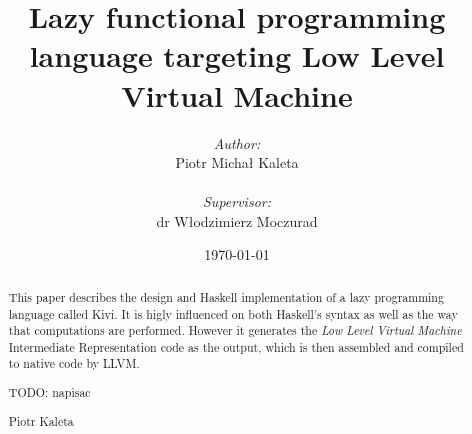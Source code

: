 \documentclass[a4paper]{report}
\begin{document}


\title{Lazy functional programming language targeting Low Level Virtual Machine}
\author{\textit{Author:}\\Piotr Micha\l{} Kaleta\\\\\emph{Supervisor:}\\dr W\l{}odzimierz Moczurad}
\date{\today}

\maketitle
{}

\newpage
\thispagestyle{empty}
\mbox{}

\Huge
\begin{abstract}
  \normalsize
  \center
  This paper describes the design and Haskell implementation of a lazy
  programming language called Kivi. It is higly influenced on both Haskell's
  syntax as well as the way that computations are performed. However it generates
  the \textit{Low Level Virtual Machine}\cite{website:llvm} Intermediate
  Representation code as the output, which is then assembled and compiled to
  native code by LLVM.
\end{abstract}


\renewcommand{\abstractname}{Acknowledgements}
\begin{abstract}
  \normalsize
  \center
  TODO: napisac
  \begin{flushright}
    Piotr Kaleta
  \end{flushright}
\end{abstract}
\end{document}
